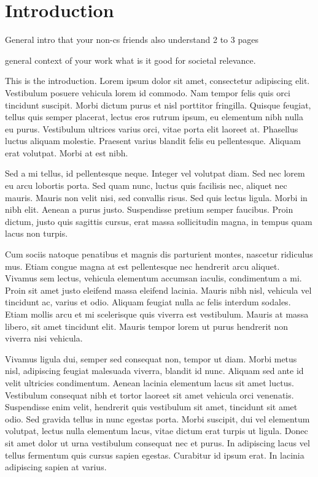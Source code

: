 \chapter{Introduction}



General intro that your non-cs friends also understand
2 to 3 pages

general context of your work
what is it good for
societal relevance.












This is the introduction. Lorem ipsum dolor sit amet, consectetur adipiscing elit. Vestibulum posuere vehicula lorem id commodo. Nam tempor felis quis orci tincidunt suscipit. Morbi dictum purus et nisl porttitor fringilla. Quisque feugiat, tellus quis semper placerat, lectus eros rutrum ipsum, eu elementum nibh nulla eu purus. Vestibulum ultrices varius orci, vitae porta elit laoreet at. Phasellus luctus aliquam molestie. Praesent varius blandit felis eu pellentesque. Aliquam erat volutpat. Morbi at est nibh.

Sed a mi tellus, id pellentesque neque. Integer vel volutpat diam. Sed nec lorem eu arcu lobortis porta. Sed quam nunc, luctus quis facilisis nec, aliquet nec mauris. Mauris non velit nisi, sed convallis risus. Sed quis lectus ligula. Morbi in nibh elit. Aenean a purus justo. Suspendisse pretium semper faucibus. Proin dictum, justo quis sagittis cursus, erat massa sollicitudin magna, in tempus quam lacus non turpis.

Cum sociis natoque penatibus et magnis dis parturient montes, nascetur ridiculus mus. Etiam congue magna at est pellentesque nec hendrerit arcu aliquet. Vivamus sem lectus, vehicula elementum accumsan iaculis, condimentum a mi. Proin sit amet justo eleifend massa eleifend lacinia. Mauris nibh nisl, vehicula vel tincidunt ac, varius et odio. Aliquam feugiat nulla ac felis interdum sodales. Etiam mollis arcu et mi scelerisque quis viverra est vestibulum. Mauris at massa libero, sit amet tincidunt elit. Mauris tempor lorem ut purus hendrerit non viverra nisi vehicula.

Vivamus ligula dui, semper sed consequat non, tempor ut diam. Morbi metus nisl, adipiscing feugiat malesuada viverra, blandit id nunc. Aliquam sed ante id velit ultricies condimentum. Aenean lacinia elementum lacus sit amet luctus. Vestibulum consequat nibh et tortor laoreet sit amet vehicula orci venenatis. Suspendisse enim velit, hendrerit quis vestibulum sit amet, tincidunt sit amet odio. Sed gravida tellus in nunc egestas porta. Morbi suscipit, dui vel elementum volutpat, lectus nulla elementum lacus, vitae dictum erat turpis ut ligula. Donec sit amet dolor ut urna vestibulum consequat nec et purus. In adipiscing lacus vel tellus fermentum quis cursus sapien egestas. Curabitur id ipsum erat. In lacinia adipiscing sapien at varius.

